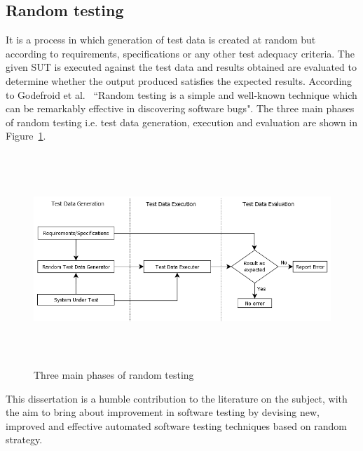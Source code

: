 \subsection{Random testing} 
It is a process in which generation of test data is created at random but according to requirements, specifications or any other test adequacy criteria. The given SUT is executed against the test data and results obtained are evaluated to determine whether the output produced satisfies the expected results. According to Godefroid et al.~\cite{godefroid2005dart} ``Random testing is a simple and well-known technique which can be remarkably effective in discovering software bugs". The three main phases of random testing i.e. test data generation, execution and evaluation are shown in Figure~\ref{fig:SoftwareTesting1}.
\\
\begin{figure}[h]
	\centering
		\includegraphics[width=15.3cm, height=8cm ]{chapter1/SoftwareTesting1.png}
		\bigskip
		\caption{Three main phases of random testing}
	\label{fig:SoftwareTesting1}
\end{figure}

This dissertation is a humble contribution to the literature on the subject, with the aim to bring about improvement in software testing by devising new, improved and effective automated software testing techniques based on random strategy.
\newpage
